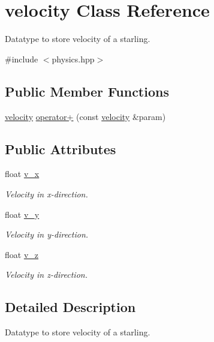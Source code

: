 \hypertarget{classvelocity}{}\section{velocity Class Reference}
\label{classvelocity}


Datatype to store velocity of a starling.  




{\ttfamily \#include $<$physics.\+hpp$>$}

\subsection*{Public Member Functions}
\begin{DoxyCompactItemize}
\item 
\mbox{\hyperlink{classvelocity}{velocity}} \mbox{\hyperlink{classvelocity_aff89ca788254a2c4a36bf065ef93dd2c}{operator+}} (const \mbox{\hyperlink{classvelocity}{velocity}} \&param)
\end{DoxyCompactItemize}
\subsection*{Public Attributes}
\begin{DoxyCompactItemize}
\item 
float \mbox{\hyperlink{classvelocity_a3988e3839681be6b71357c5ea4de68e4}{v\+\_\+x}}
\begin{DoxyCompactList}\small\item\em Velocity in x-\/direction. \end{DoxyCompactList}\item 
float \mbox{\hyperlink{classvelocity_a1e894a568353bfa94db41117d332ff14}{v\+\_\+y}}
\begin{DoxyCompactList}\small\item\em Velocity in y-\/direction. \end{DoxyCompactList}\item 
float \mbox{\hyperlink{classvelocity_ae6409b77404f8487bbddb5e676120210}{v\+\_\+z}}
\begin{DoxyCompactList}\small\item\em Velocity in z-\/direction. \end{DoxyCompactList}\end{DoxyCompactItemize}


\subsection{Detailed Description}
Datatype to store velocity of a starling. 


